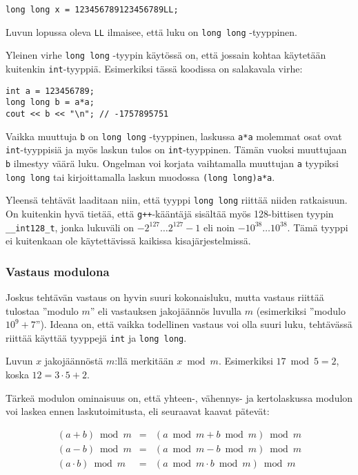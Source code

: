 \begin{lstlisting}
long long x = 123456789123456789LL;
\end{lstlisting}
Luvun lopussa oleva \texttt{LL}
ilmaisee, että luku on \texttt{long long} -tyyppinen.

Yleinen virhe \texttt{long long} -tyypin käytössä on,
että jossain kohtaa käytetään kuitenkin \texttt{int}-tyyppiä.
Esimerkiksi tässä koodissa on salakavala virhe:

\begin{lstlisting}
int a = 123456789;
long long b = a*a;
cout << b << "\n"; // -1757895751
\end{lstlisting}

Vaikka muuttuja \texttt{b} on \texttt{long long} -tyyppinen,
laskussa \texttt{a*a} molemmat osat ovat \texttt{int}-tyyppisiä
ja myös laskun tulos on \texttt{int}-tyyppinen.
Tämän vuoksi muuttujaan \texttt{b} ilmestyy väärä luku.
Ongelman voi korjata vaihtamalla muuttujan \texttt{a}
tyypiksi \texttt{long long} tai kirjoittamalla
laskun muodossa \texttt{(long long)a*a}.

Yleensä tehtävät laaditaan niin, että tyyppi
\texttt{long long} riittää niiden ratkaisuun.
On kuitenkin hyvä tietää, että \texttt{g++}-kääntäjä sisältää myös 128-bittisen
tyypin \texttt{\_\_int128\_t}, jonka lukuväli on
$-2^{127} \ldots 2^{127}-1$ eli noin $-10^{38} \ldots 10^{38}$.
Tämä tyyppi ei kuitenkaan ole käytettävissä kaikissa kisajärjestelmissä.

\subsubsection{Vastaus modulona}


Joskus tehtävän vastaus on hyvin suuri kokonaisluku,
mutta vastaus riittää tulostaa ''modulo $m$''
eli vastauksen jakojäännös luvulla $m$
(esimerkiksi ''modulo $10^9+7$'').
Ideana on, että vaikka todellinen vastaus
voi olla suuri luku,
tehtävässä riittää käyttää tyyppejä \texttt{int} ja \texttt{long long}.

Luvun $x$ jakojäännöstä $m$:llä
merkitään $x \bmod m$.
Esimerkiksi $17 \bmod 5 = 2$,
koska $12 = 3 \cdot 5 + 2$.

Tärkeä modulon ominaisuus on,
että yhteen-, vähennys- ja kertolaskussa
modulon voi laskea ennen laskutoimitusta,
eli seuraavat kaavat pätevät:

\[
\begin{array}{rcr}
(a+b) \bmod m & = & (a \bmod m + b \bmod m) \bmod m \\
(a-b) \bmod m & = & (a \bmod m - b \bmod m) \bmod m \\
(a \cdot b) \bmod m & = & (a \bmod m \cdot b \bmod m) \bmod m
\end{array}
\]

